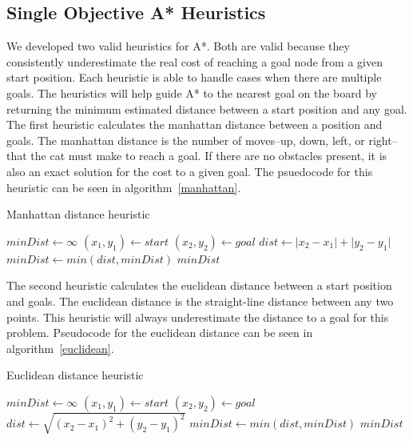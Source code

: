 \documentclass[12pt, conference, compsocconf]{IEEEtran}
\begin{document}
\subsection{Single Objective A* Heuristics}
We developed two valid heuristics for A*.  Both are valid because they
consistently underestimate the real cost of reaching a goal node from a given
start position.  Each heuristic is able to handle cases when there are multiple
goals.  The heuristics will help guide A* to the nearest goal on the board by
returning the minimum estimated distance between a start position and any goal.
The first heuristic calculates the manhattan distance between a position and
goals.  The manhattan distance is the number of moves--up, down, left, or
right-- that the cat must make to reach a goal.  If there are no obstacles
present, it is also an exact solution for the cost to a given goal.  The
psuedocode for this heuristic can be seen in algorithm~\ref{manhattan}.

\begin{algorithm}
    \caption{Manhattan distance heuristic}
    \label{manhattan}
    \begin{algorithmic}[1]
        \State $minDist\gets \infty$
        \State $(x_1, y_1)\gets start$
        \State $(x_2, y_2)\gets goal$
        \State $dist\gets \lvert x_2-x_1\rvert + \lvert y_2-y_1\rvert$
        \State $minDist\gets min(dist, minDist)$
        \EndFor
        \Return $minDist$
        \EndProcedure
    \end{algorithmic}
\end{algorithm}

The second heuristic calculates the euclidean distance between a start position
and goals.  The euclidean distance is the straight-line distance between any
two points.  This heuristic will always underestimate the distance to a
goal for this problem.  Pseudocode for the euclidean distance can be seen in
algorithm~\ref{euclidean}.

\begin{algorithm}
    \caption{Euclidean distance heuristic}
    \label{euclidean}
    \begin{algorithmic}[1]
        \State $minDist\gets \infty$
        \State $(x_1, y_1)\gets start$
        \State $(x_2, y_2)\gets goal$
        \State $dist\gets \sqrt{(x_2-x_1)^2+(y_2-y_1)^2}$
        \State $minDist\gets min(dist, minDist)$
        \EndFor
        \Return $minDist$
        \EndProcedure
    \end{algorithmic}
\end{algorithm}
\end{document}
